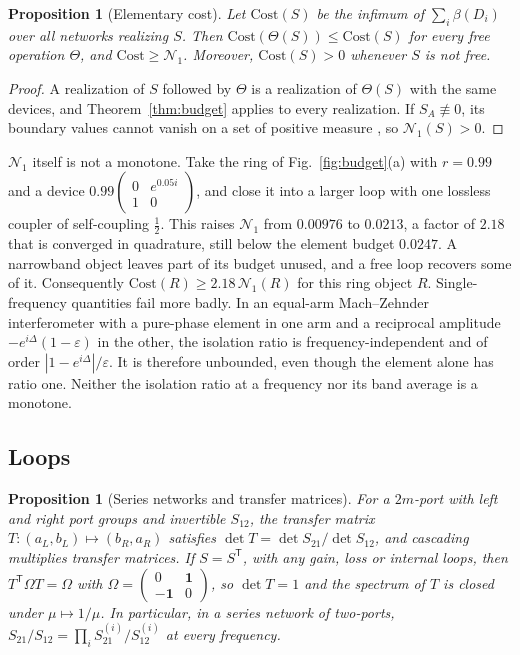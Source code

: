 \documentclass[aps,pra,twocolumn,superscriptaddress,floatfix,nofootinbib]{revtex4-2}
\newtheorem{proposition}[theorem]{Proposition}
\theoremstyle{definition}
\newcommand{\NN}{\mathcal N_1}
\newcommand{\one}{\mathbf 1}
\newcommand{\T}{\mathsf T}
\newcommand{\Cost}{\mathrm{Cost}}
\begin{document}
\begin{proposition}[Elementary cost]\label{prop:cost}
Let $\Cost(S)$ be the infimum of $\sum_i\beta(D_i)$ over all networks realizing $S$. Then $\Cost(\Theta(S))\le\Cost(S)$ for every free operation $\Theta$, and $\Cost\ge\NN$. Moreover, $\Cost(S)>0$ whenever $S$ is not free.
\end{proposition}

\begin{proof}
A realization of $S$ followed by $\Theta$ is a realization of $\Theta(S)$ with the same devices, and Theorem~\ref{thm:budget} applies to every realization. If $S_A\not\equiv0$, its boundary values cannot vanish on a set of positive measure \cite{Gar07}, so $\NN(S)>0$.
\end{proof}

$\NN$ itself is not a monotone. Take the ring of Fig.~\ref{fig:budget}(a) with $r=0.99$ and a device $0.99\left(\begin{smallmatrix}0&e^{0.05i}\\1&0\end{smallmatrix}\right)$, and close it into a larger loop with one lossless coupler of self-coupling $\frac12$. This raises $\NN$ from $0.00976$ to $0.0213$, a factor of $2.18$ that is converged in quadrature, still below the element budget $0.0247$. A narrowband object leaves part of its budget unused, and a free loop recovers some of it. Consequently $\Cost(R)\ge2.18\,\NN(R)$ for this ring object $R$. Single-frequency quantities fail more badly. In an equal-arm Mach--Zehnder interferometer with a pure-phase element in one arm and a reciprocal amplitude $-e^{i\Delta}(1-\varepsilon)$ in the other, the isolation ratio is frequency-independent and of order $|1-e^{i\Delta}|/\varepsilon$. It is therefore unbounded, even though the element alone has ratio one. Neither the isolation ratio at a frequency nor its band average is a monotone.

\subsection{Loops}

\begin{proposition}[Series networks and transfer matrices]\label{prop:series}
For a $2m$-port with left and right port groups and invertible $S_{12}$, the transfer matrix $T:(a_L,b_L)\mapsto(b_R,a_R)$ satisfies $\det T=\det S_{21}/\det S_{12}$, and cascading multiplies transfer matrices. If $S=S^\T$, with any gain, loss or internal loops, then $T^\T\Omega T=\Omega$ with $\Omega=\left(\begin{smallmatrix}0&\one\\-\one&0\end{smallmatrix}\right)$, so $\det T=1$ and the spectrum of $T$ is closed under $\mu\mapsto1/\mu$. In particular, in a series network of two-ports, $S_{21}/S_{12}=\prod_iS^{(i)}_{21}/S^{(i)}_{12}$ at every frequency.
\end{proposition}
\end{document}
